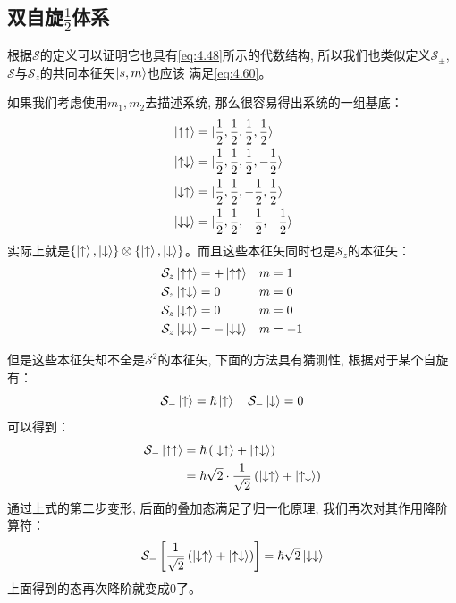 \documentclass[a4paper,zihao=-4,linespread=1]{ctexrep}
\begin{document}
    \subsection*{双自旋$\frac{1}{2}$体系}
    根据$\mathcal{S}$的定义可以证明它也具有\ref{eq:4.48}所示的代数结构, 所以我们也类似定义$\mathcal{S_\pm}$, $\mathcal{S}$与$\mathcal{S}_z$的共同本征矢$\ket{s,m}$也应该
    满足\ref{eq:4.60}。

    如果我们考虑使用$m_1,m_2$去描述系统, 那么很容易得出系统的一组基底：
    \begin{equation}
        \label{eq:4.92}
        \begin{split}
            &\ket{\uparrow\uparrow}=\ket{\frac{1}{2},\frac{1}{2},\frac{1}{2},\frac{1}{2}}\\
            &\ket{\uparrow\downarrow}=\ket{\frac{1}{2},\frac{1}{2},\frac{1}{2},-\frac{1}{2}}\\
            &\ket{\downarrow\uparrow}=\ket{\frac{1}{2},\frac{1}{2},-\frac{1}{2},\frac{1}{2}}\\
            &\ket{\downarrow\downarrow}=\ket{\frac{1}{2},\frac{1}{2},-\frac{1}{2},-\frac{1}{2}}
        \end{split}
    \end{equation}
    实际上就是$\{\ket{\uparrow},\ket{\downarrow}\}\otimes\{\ket{\uparrow},\ket{\downarrow}\}$。而且这些本征矢同时也是$\mathcal{S}_z$的本征矢：
    \begin{align*}
        &\mathcal{S}_z\ket{\uparrow\uparrow}=+\ket{\uparrow\uparrow}&m&=1\\
        &\mathcal{S}_z\ket{\uparrow\downarrow}=0&m&=0\\
        &\mathcal{S}_z\ket{\downarrow\uparrow}=0&m&=0\\
        &\mathcal{S}_z\ket{\downarrow\downarrow}=-\ket{\downarrow\downarrow} &m&=-1
    \end{align*}
   
    但是这些本征矢却不全是$\mathcal{S}^2$的本征矢, 下面的方法具有猜测性, 根据对于某个自旋有：
    \[\mathcal{S}_-\ket{\uparrow}=\hbar\ket{\uparrow}\quad\mathcal{S}_-\ket{\downarrow}=0\]
    可以得到：
    \begin{align*}
        \mathcal{S}_-\ket{\uparrow\uparrow}&=\hbar\left(\ket{\downarrow\uparrow}+\ket{\uparrow\downarrow}\right)\\
        &=\hbar\sqrt{2}\cdot\frac{1}{\sqrt{2}}\left(\ket{\downarrow\uparrow}+\ket{\uparrow\downarrow}\right)
    \end{align*}
    通过上式的第二步变形, 后面的叠加态满足了归一化原理, 我们再次对其作用降阶算符：
    \[\mathcal{S}_-\left[\frac{1}{\sqrt{2}}\left(\ket{\downarrow\uparrow}+\ket{\uparrow\downarrow}\right)\right]=\hbar\sqrt{2}\ket{\downarrow\downarrow}\]
    上面得到的态再次降阶就变成$0$了。
\end{document}

